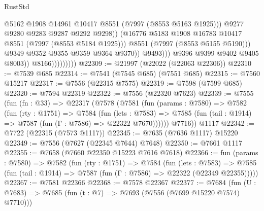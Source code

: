 \begin{lexlean}{RustStd}
\begin{coremodule}
                                            @5162
                                            @1908
                                            @14961
                                            @10417
                                            @8551
                                            (@7997 (@8553 @5163 @1925)))
                                          @9277
                                          @9280
                                          @9283
                                          @9287
                                          @9292
                                          @9298))
                                      (@16776
                                        @5183
                                        @1908
                                        @16783
                                        @10417
                                        @8551
                                        (@7997 (@8553 @5184 @1925)))
                                      @8551
                                      (@7997 (@8553 @5155 @5190)))
                                    @9349
                                    @9352
                                    @9355
                                    @9359
                                    @9364
                                    @9370))
                                @9493)))
                          @9396
                          @9399
                          @9402
                          @9405
                          @8003))
                      @8166)))))))))
@22309 := @21997 (@22022 (@22063 @22306))
@22310 := @7539 @685
@22314 := @7541 (@7545 @685) (@7551 @685)
@22315 := @7560 @15217
@22317 := @7556 (@22315 @7575)
@22319 := @7598 (@7599 @685)
@22320 := @7594 @22319
@22322 := @7556 (@22320 @7623)
@22339 := @7555
    (fun (fn : @33) =>
    @22317
      (@7578
        (@7581
          (fun (params : @7580) =>
          @7582
            (fun (rty : @1751) =>
            @7584
              (fun (lets : @7583) =>
              @7585 (fun (tail : @1914) => @7587 (fun (Γ : @7586) => @22322 @7670))))))
        @7716))
    @1117
@22342 := @7722 (@22315 (@7573 @1117))
@22345 := @7635 (@7636 @1117) @15220
@22349 := @7556 (@7627 (@22345 @7644) @7648)
@22350 := @7661 @1117
@22355 := @7658 (@7660 @22350 @15223 @7616 @7618)
@22366 := fun (params : @7580) =>
  @7582
    (fun (rty : @1751) =>
    @7584
      (fun (lets : @7583) =>
      @7585 (fun (tail : @1914) => @7587 (fun (Γ : @7586) => @22322 (@22349 @22355)))))
@22367 := @7581 @22366
@22368 := @7578 @22367
@22377 := @7684
    (fun (U : @7683) => @7685 (fun (t : @7) => @7693 (@7556 (@7699 @15220 @7574) @7710)))

\end{coremodule}
\end{lexlean}
